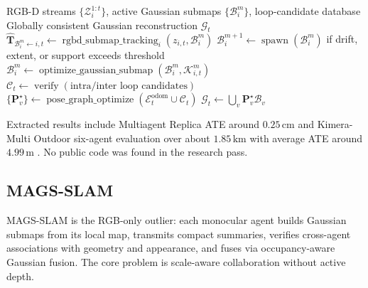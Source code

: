 \documentclass[11pt, a4paper, logo]{googledeepmind}
\begin{document}
\begin{algorithm}[H]
\caption{GRAND-SLAM}
\label{alg:grand-slam}
\small
\begin{algorithmic}[1]
  \Require RGB-D streams $\{\mathcal{Z}_i^{1:t}\}$, active Gaussian submaps $\{\mathcal{B}_{i}^{m}\}$, loop-candidate database
  \Ensure Globally consistent Gaussian reconstruction $\mathcal{G}_t$
  \State $\hat{\mathbf{T}}_{\mathcal{B}_i^m\leftarrow i,t} \gets \operatorname{rgbd\_submap\_tracking}_i(z_{i,t},\mathcal{B}_{i}^{m})$ 
  \State $\mathcal{B}_{i}^{m+1} \gets \operatorname{spawn}(\mathcal{B}_{i}^{m})$ if drift, extent, or support exceeds threshold 
  \State $\mathcal{B}_{i}^{m} \gets \operatorname{optimize\_gaussian\_submap}(\mathcal{B}_{i}^{m},\mathcal{K}_{i,t}^{m})$ 
  \State $\mathcal{C}_t \gets \operatorname{verify}(\text{intra/inter loop candidates})$ 
  \State $\{\mathbf{P}_v^\star\} \gets \operatorname{pose\_graph\_optimize}(\mathcal{E}^{\mathrm{odom}}_t\cup\mathcal{C}_t)$ 
  \State $\mathcal{G}_t \gets \bigcup_v\mathbf{P}_v^\star\mathcal{B}_v$ 
\end{algorithmic}
\end{algorithm}

Extracted results include Multiagent Replica ATE around $0.25\,\mathrm{cm}$ and Kimera-Multi Outdoor six-agent evaluation over about $1.85\,\mathrm{km}$ with average ATE around $4.99\,\mathrm{m}$ \citep{tian2023kimera_multi}. No public code was found in the research pass.

\subsection{MAGS-SLAM}
\label{sec:systems:mags-slam}

MAGS-SLAM \citep{cao2026mags_slam} is the RGB-only outlier: each monocular agent builds Gaussian submaps from its local map, transmits compact summaries, verifies cross-agent associations with geometry and appearance, and fuses via occupancy-aware Gaussian fusion. The core problem is scale-aware collaboration without active depth.
\end{document}
